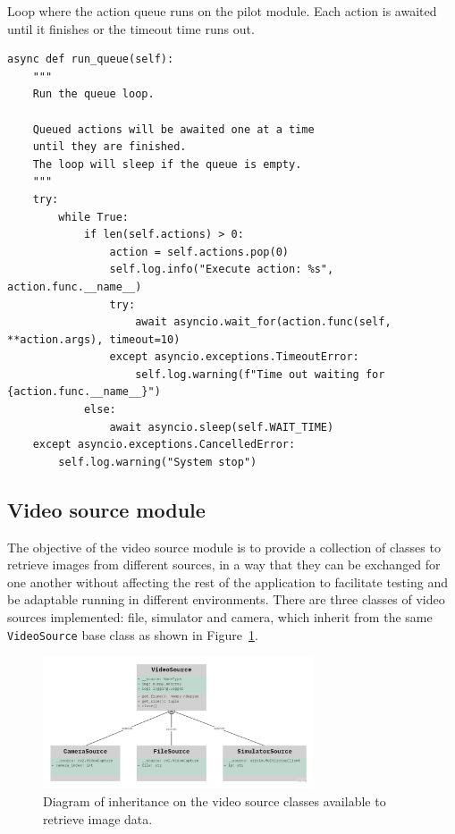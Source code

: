 \begin{listing}[h!]
    \caption{Loop where the action queue runs on the pilot module. Each action is awaited until it finishes or the timeout time runs out.}{}
    \label{lst:pilot.queue}
    \begin{verbatim}
async def run_queue(self):
    """
    Run the queue loop.
    
    Queued actions will be awaited one at a time
    until they are finished.
    The loop will sleep if the queue is empty.
    """
    try:
        while True:
            if len(self.actions) > 0:
                action = self.actions.pop(0)
                self.log.info("Execute action: %s", action.func.__name__)
                try:
                    await asyncio.wait_for(action.func(self, **action.args), timeout=10)
                except asyncio.exceptions.TimeoutError:
                    self.log.warning(f"Time out waiting for {action.func.__name__}")
            else:
                await asyncio.sleep(self.WAIT_TIME)
    except asyncio.exceptions.CancelledError:
        self.log.warning("System stop")
    \end{verbatim}
\end{listing}

\subsection{Video source module}

The objective of the video source module is to provide a collection of classes to retrieve images from different sources,
in a way that they can be exchanged for one another without affecting the rest of the application to facilitate testing and be adaptable running in different environments.
There are three classes of video sources implemented: file, simulator and camera, which inherit from the same \texttt{VideoSource} base class as shown in Figure~\ref{fig:video-source-inheritance}.

\begin{figure}
  \centering
  \includegraphics[width=8cm, keepaspectratio]{img/uml-video-source.jpg}
  \caption{Diagram of inheritance on the video source classes available to retrieve image data.}
  \label{fig:video-source-inheritance}
\end{figure}

